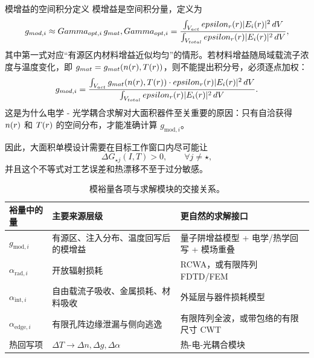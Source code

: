 \begin{NoteBox}{模增益的空间积分定义}
模增益是空间积分量，定义为
\begin{equation}
g_{\mathrm{mod},i}
\approx
\Gamma_{\mathrm{opt},i}\,g_{\mathrm{mat}},
\qquad
\Gamma_{\mathrm{opt},i}
=
\frac{\int_{V_{\mathrm{act}}} \varepsilon_r(\rvec)|\E_i(\rvec)|^2\,\dd V}{\int_{V_{\mathrm{total}}} \varepsilon_r(\rvec)|\E_i(\rvec)|^2\,\dd V},
\end{equation}
其中第一式对应“有源区内材料增益近似均匀”的情形。若材料增益随局域载流子浓度与温度变化，即 $g_{mat}=g_{mat}(n(r),T(r))$，则不能提出积分号，必须逐点加权：
\begin{equation}
g_{mod,i} = \frac{\int_{V_{act}} g_{mat}(n(r), T(r)) \cdot epsilon_r(r)|E_i(r)|^2\,d V}{\int_{V_{total}} epsilon_r(r)|E_i(r)|^2\,d V}.
\end{equation}
这是为什么电学 - 光学耦合求解对大面积器件至关重要的原因：只有自洽获得 $n(r)$ 和 $T(r)$ 的空间分布，才能准确计算 $g_{\mathrm{mod},i}$。
\end{NoteBox}

因此，大面积单模设计需要在目标工作窗口内尽可能让
\begin{equation}
\Delta G_{\star j}(I,T) > 0,
\qquad \forall j\neq \star,
\label{eq:single_mode_margin}
\end{equation}
并且这个不等式对工艺误差和热漂移不至于过分敏感。

\begin{table}[htbp]
  \centering
  \footnotesize
  \caption{模裕量各项与求解模块的交接关系。}
  \label{tab:modal_margin_handoff}
  \begin{tabularx}{\textwidth}{@{}p{2.6cm}p{3.0cm}Y@{}}
    \toprule
    裕量中的量 & 主要来源层级 & 更自然的求解接口 \\ \midrule
    $g_{\mathrm{mod},i}$ & 有源区、注入分布、温度回写后的模增益 & 量子阱增益模型 + 电学/热学回写 + 模场重叠 \\
    $\alpha_{\mathrm{rad},i}$ & 开放辐射损耗 & RCWA，或有限阵列 FDTD/FEM \\
    $\alpha_{\mathrm{int},i}$ & 自由载流子吸收、金属损耗、材料吸收 & 外延层与器件损耗模型 \\
    $\alpha_{\mathrm{edge},i}$ & 有限孔阵边缘泄漏与侧向逃逸 & 有限阵列全波，或带包络的有限尺寸 CWT \\
    热回写项 & $\Delta T\rightarrow\Delta n,\Delta g,\Delta\alpha$ & 热-电-光耦合模块 \\
    \bottomrule
  \end{tabularx}
\end{table}

